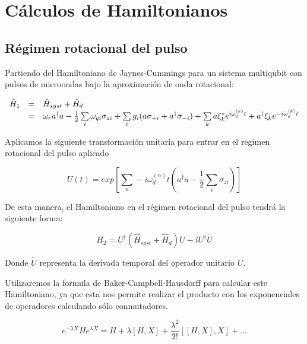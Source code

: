 \chapter{Cálculos de Hamiltonianos}
\label{ch:hamiltonians}

\section{Régimen rotacional del pulso}

Partiendo del Hamiltoniano de Jaynes-Cummings para un sistema multiqubit con pulsos de microondas bajo la aproximación de onda rotacional:

\begin{equation}
    \begin{array}{r c l}
        \hat{H}_1 &=& \hat{H}_{syst} + \hat{H}_d \\
                  &=& \omega_r a^\dag a - \frac{1}{2} \sum\limits_i \omega_{qi} \sigma_{zi} + \sum\limits_i g_i (a \sigma_{+ i} + a^\dagger \sigma_{- i}) + \sum\limits_k a\xi_k^*e^{i\omega_d^{(k)}t}+ a^\dagger\xi_ke^{-i\omega_d^{(k)}t}
    \end{array}
\end{equation}

Aplicamos la siguiente transformación unitaria para entrar en el regimen rotacional del pulso aplicado

\begin{equation}
    U(t) = exp[\sum\limits_n-i \omega_d^{(n)} t(a^\dagger a - \frac{1}{2} \sum\limits_i \sigma_{z i})]
\end{equation}

De esta manera, el Hamiltoniano en el régimen rotacional del pulso tendrá la siguiente forma:

\begin{equation}
    \hat{H}_2 = U^\dagger (\hat{H}_{syst} + \hat{H}_d) U - i U^\dagger \dot{U}
\end{equation}

Donde $\dot{U}$ representa la derivada temporal del operador unitario $U$.

Utilizaremos la formula de Baker-Campbell-Hausdorff para calcular este Hamiltoniano, ya que esta nos permite realizar el producto con los exponenciales de operadores calculando sólo conmutadores.

\begin{equation}
    e^{-\lambda X} H e^{\lambda X} = H + \lambda [H,X] + \frac{\lambda^2}{2!}[[H,X],X] + ...
\end{equation}

